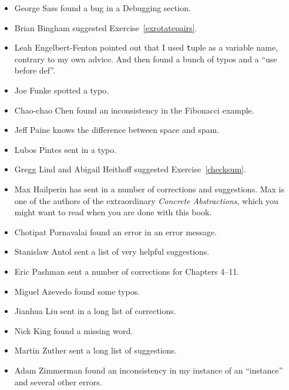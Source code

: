 \documentclass[
DIV=11,
fontsize=12,
twoside,
headinclude=false,
titlepage=firstiscover,
abstract=true,
headsepline=true,
footsepline=true,
chapterprefix=true, %
headings=big,
bibliography=totoc,%
captions=tableheading
]{scrbook}
\theoremstyle{definition}
\begin{document}
\begin{itemize}
\item George Sass found a bug in a Debugging section.

\item Brian Bingham suggested Exercise~\ref{exrotatepairs}.

\item Leah Engelbert-Fenton pointed out that I used {\texttt tuple}
as a variable name, contrary to my own advice.  And then found
a bunch of typos and a ``use before def''.

\item Joe Funke spotted a typo.

\item Chao-chao Chen found an inconsistency in the Fibonacci example.

\item Jeff Paine knows the difference between space and spam.

\item Lubos Pintes sent in a typo.

\item Gregg Lind and Abigail Heithoff suggested Exercise~\ref{checksum}.

\item Max Hailperin has sent in a number of corrections and
  suggestions.  Max is one of the authors of the extraordinary {\em
    Concrete Abstractions}, which you might want to read when you are
  done with this book.

\item Chotipat Pornavalai found an error in an error message.

\item Stanislaw Antol sent a list of very helpful suggestions.

\item Eric Pashman sent a number of corrections for Chapters 4--11.

\item Miguel Azevedo found some typos.

\item Jianhua Liu sent in a long list of corrections.

\item Nick King found a missing word.

\item Martin Zuther sent a long list of suggestions.

\item Adam Zimmerman found an inconsistency in my instance
of an ``instance'' and several other errors.


\end{itemize}
\end{document}
